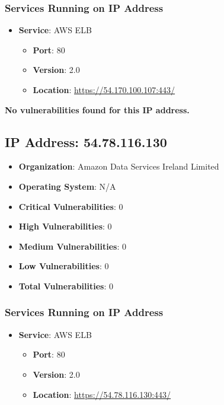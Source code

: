 \documentclass{article}
\begin{document}
\subsubsection*{Services Running on IP Address}

\begin{itemize}
    
        \item \textbf{Service}: AWS ELB
        \begin{itemize}
            \item \textbf{Port}: 80
            \item \textbf{Version}:  2.0 
            \item \textbf{Location}: \href{ https://54.170.100.107:443/ }{ https://54.170.100.107:443/ }
        \end{itemize}
    
\end{itemize}


\textbf{No vulnerabilities found for this IP address.}




\clearpage



\subsection{IP Address: 54.78.116.130}

\begin{itemize}
    \item \textbf{Organization}: Amazon Data Services Ireland Limited
    \item \textbf{Operating System}:  N/A 
    \item \textbf{Critical Vulnerabilities}: 0
    \item \textbf{High Vulnerabilities}: 0
    \item \textbf{Medium Vulnerabilities}: 0
    \item \textbf{Low Vulnerabilities}: 0
    \item \textbf{Total Vulnerabilities}: 0
\end{itemize}

\subsubsection*{Services Running on IP Address}

\begin{itemize}
    
        \item \textbf{Service}: AWS ELB
        \begin{itemize}
            \item \textbf{Port}: 80
            \item \textbf{Version}:  2.0 
            \item \textbf{Location}: \href{ https://54.78.116.130:443/ }{ https://54.78.116.130:443/ }
        \end{itemize}
    
\end{itemize}
\end{document}
